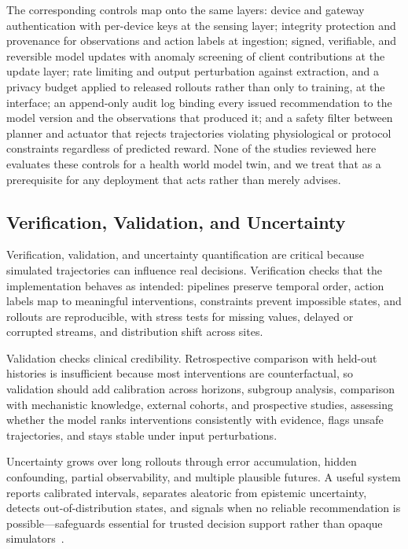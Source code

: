 \documentclass[journal]{IEEEtran}
\begin{document}
The corresponding controls map onto the same layers: device and gateway authentication with per-device keys at the sensing layer; integrity protection and provenance for observations and action labels at ingestion; signed, verifiable, and reversible model updates with anomaly screening of client contributions at the update layer; rate limiting and output perturbation against extraction, and a privacy budget applied to released rollouts rather than only to training, at the interface; an append-only audit log binding every issued recommendation to the model version and the observations that produced it; and a safety filter between planner and actuator that rejects trajectories violating physiological or protocol constraints regardless of predicted reward. None of the studies reviewed here evaluates these controls for a health world model twin, and we treat that as a prerequisite for any deployment that acts rather than merely advises.

\subsection{Verification, Validation, and Uncertainty}
Verification, validation, and uncertainty quantification are critical because simulated trajectories can influence real decisions. Verification checks that the implementation behaves as intended: pipelines preserve temporal order, action labels map to meaningful interventions, constraints prevent impossible states, and rollouts are reproducible, with stress tests for missing values, delayed or corrupted streams, and distribution shift across sites.

Validation checks clinical credibility. Retrospective comparison with held-out histories is insufficient because most interventions are counterfactual, so validation should add calibration across horizons, subgroup analysis, comparison with mechanistic knowledge, external cohorts, and prospective studies, assessing whether the model ranks interventions consistently with evidence, flags unsafe trajectories, and stays stable under input perturbations.

Uncertainty grows over long rollouts through error accumulation, hidden confounding, partial observability, and multiple plausible futures. A useful system reports calibrated intervals, separates aleatoric from epistemic uncertainty, detects out-of-distribution states, and signals when no reliable recommendation is possible---safeguards essential for trusted decision support rather than opaque simulators~\cite{Sel2025VVUQ}.
\end{document}
